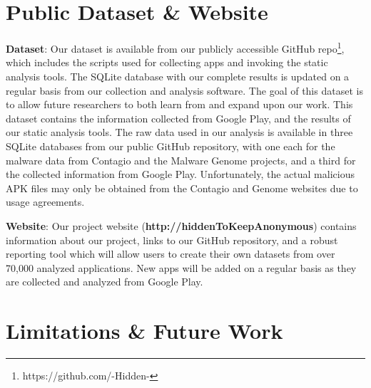 \documentclass{llncs}
\newif\ifisnopii
\begin{document}



\section{Public Dataset \& Website}
\label{sec:dataset}

\textbf{Dataset}: Our dataset is available from our publicly accessible GitHub repo\footnote{\ifisnopii https://github.com/DroidDarwin \else https://github.com/-Hidden- \fi}, which includes the scripts used for collecting apps and invoking the static analysis tools. The SQLite database with our complete results is updated on a regular basis from our collection and analysis software. The goal of this dataset is to allow future researchers to both learn from and expand upon our work. This dataset contains the information collected from Google Play, and the results of our static analysis tools. The raw data used in our analysis is available in three SQLite databases from our public GitHub repository, with one each for the malware data from Contagio and the Malware Genome projects, and a third for the collected information from Google Play. Unfortunately, the actual malicious APK files may only be obtained from the Contagio and Genome websites due to usage agreements.

\noindent
\textbf{Website}: Our project website (\textbf{\ifisnopii http://darwin.rit.edu \else http://hiddenToKeepAnonymous\fi}) contains information about our project, links to our GitHub repository, and a robust reporting tool which will allow users to create their own datasets from over 70,000 analyzed applications. New apps will be added on a regular basis as they are collected and analyzed from Google Play.


\section{Limitations \& Future Work}
\label{sec:limitations}
\end{document}
